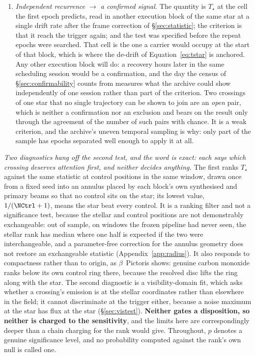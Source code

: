 \begin{enumerate}[label=(\roman*),leftmargin=1.9em,itemsep=3pt,topsep=3pt,parsep=0pt]
{window it falls}, wherever a later block covers the frequency. An
unattributed crossing is a target for follow-up and not a detection. The
window's price is that the survey constrains nothing inside it
(Appendix~\ref{app:linemask}).
\item \emph{Independent recurrence $\to$ a confirmed signal.} The quantity is
$T_\star$ at the cell the first epoch predicts, read in another execution
block of the same star at a single drift rate after the frame correction of
\S\ref{sec:statistic}; the criterion is that it reach the trigger again; and
the test was specified before the repeat epochs were searched. That cell is the one a carrier would occupy at the start of that block,
which is where the de-drift of Equation~\ref{eq:tstar} is anchored. Any other execution block
will do: a recovery hours later in the same scheduling session would be a
confirmation, and the day the census of \S\ref{sec:confirmability} counts from
measures what the archive could show independently of one session rather than
part of the criterion. Two crossings of one star that no single trajectory can
be shown to join are an \emph{open} pair, which is neither a confirmation nor
an exclusion and bears on the result only through the agreement of the number
of such pairs with chance. It is a weak criterion, and the archive's uneven
temporal sampling is why: only part of the sample has epochs separated well
enough to apply it at all.
\end{enumerate}

\emph{Two diagnostics hang off the second test, and the word is exact: each
says which crossing deserves attention first, and neither decides anything.}
The first ranks $T_\star$ against the same statistic at \NCtrl{} control
positions in the same window, drawn once from a fixed seed into an annulus
placed by each block's own synthesised and primary beams so that no control
sits on the star; its lowest value, $1/(\NCtrl+1)$, means the star beat every
control. It is a ranking filter and not a significance test, because the
stellar and control positions are not demonstrably exchangeable: out of
sample, on \HoWin{} windows the frozen pipeline had never seen, the stellar
rank has median \HoRankMed{} where one half is expected if the two were
interchangeable, and a parameter-free correction for the annulus geometry
does not restore an exchangeable statistic (Appendix~\ref{app:radius}). It
also responds to compactness rather than to origin, as $\beta$~Pictoris
shows: genuine carbon monoxide ranks below its own control ring there,
because the resolved disc lifts the ring along with the star. The second
diagnostic is a visibility-domain fit, which asks whether a crossing's
emission is at the stellar coordinates rather than elsewhere in the field; it
cannot discriminate at the trigger either, because a noise maximum at the
star has flux at the star (\S\ref{sec:vistest}). \textbf{Neither gates a
disposition, so neither is charged to the sensitivity}, and the limits here
are correspondingly deeper than a chain charging for the rank would give.
Throughout, $p$ denotes a genuine significance level, and no probability
computed against the rank's own null is called one.

